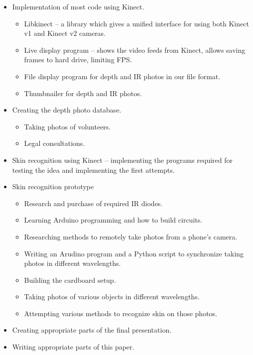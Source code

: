         \begin{itemize}
            \item Implementation of most code using Kinect.
            \begin{itemize}
                \item Libkinect -- a library which gives a unified interface for
                using both Kinect v1 and Kinect v2 cameras.
                \item Live display program -- shows the video feeds from Kinect,
                allows saving frames to hard drive, limiting FPS.
                \item File display program for depth and IR photos in our file format.
                \item Thumbnailer for depth and IR photos.
            \end{itemize}
            \item Creating the depth photo database.
            \begin{itemize}
                \item Taking photos of volunteers.
                \item Legal consultations.
            \end{itemize}
            \item Skin recognition using Kinect -- implementing the programs required
            for testing the idea and implementing the first attempts.
            \item Skin recognition prototype
            \begin{itemize}
                \item Research and purchase of required IR diodes.
                \item Learning Arduino programming and how to build circuits.
                \item Researching methods to remotely take photos from a phone's camera.
                \item Writing an Arudino program and a Python script to synchronize
                taking photos in different wavelengths.
                \item Building the cardboard setup.
                \item Taking photos of various objects in different wavelengths.
                \item Attempting various methods to recognize skin on those photos.
            \end{itemize}
            \item Creating appropriate parts of the final presentation.
            \item Writing appropriate parts of this paper.
        \end{itemize}

